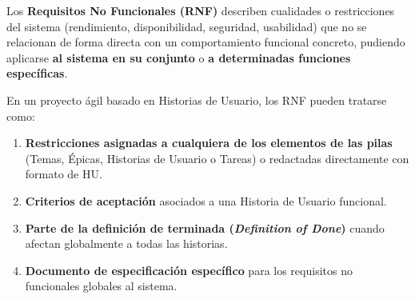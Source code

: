 Los \textbf{Requisitos No Funcionales (RNF)} describen cualidades o restricciones del sistema (rendimiento, disponibilidad, seguridad, usabilidad) que no se relacionan de forma directa con un comportamiento funcional concreto, pudiendo aplicarse \textbf{al sistema en su conjunto} o \textbf{a determinadas funciones específicas}.

\begin{teorema}
En un proyecto ágil basado en Historias de Usuario, los RNF pueden tratarse como:
\begin{enumerate}[label=\textbf{\arabic*.}, itemsep=3pt]
    \item \textbf{Restricciones asignadas a cualquiera de los elementos de las pilas} (Temas, Épicas, Historias de Usuario o Tareas) o redactadas directamente con formato de HU.
    \item \textbf{Criterios de aceptación} asociados a una Historia de Usuario funcional.
    \item \textbf{Parte de la definición de terminada (\textit{Definition of Done})} cuando afectan globalmente a todas las historias.
    \item \textbf{Documento de especificación específico} para los requisitos no funcionales globales al sistema.
\end{enumerate}
\end{teorema}

